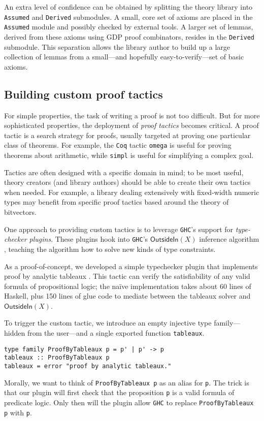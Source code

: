 \documentclass[format=sigplan, review=false, screen=true]{acmart}
\begin{document}
An extra level of confidence can be obtained by splitting the theory library
into \texttt{Assumed} and \texttt{Derived} submodules. A small, core set of
axioms are placed in the \texttt{Assumed} module and possibly checked by
external tools. A larger set of lemmas, derived from these axioms using GDP
proof combinators, resides in the \texttt{Derived} submodule. This separation
allows the library author to build up a large collection of lemmas from a
small---and hopefully easy-to-verify---set of basic axioms.

\subsection{Building custom proof tactics}\label{tactics}

For simple properties, the task of writing a proof is not too difficult. But for
more sophisticated properties, the deployment of \emph{proof tactics} becomes
critical. A proof tactic is a search strategy for proofs, usually targeted at
proving one particular class of theorems. For example, the \texttt{Coq} tactic
\texttt{omega} is useful for proving theorems about arithmetic, while
\texttt{simpl} is useful for simplifying a complex goal.

Tactics are often designed with a specific domain in mind; to be most useful,
theory creators (and library authors) should be able to create their own tactics
when needed. For example, a library dealing extensively with fixed-width numeric types
may benefit from specific proof tactics based around the theory of bitvectors.

One approach to providing custom tactics is to leverage \texttt{GHC}'s support for
\emph{type-checker plugins}. These plugins hook into \texttt{GHC}'s $\textsf{OutsideIn}(X)$
inference algorithm \cite{vytiniotis2011outsidein}, teaching the algorithm how to solve
new kinds of type constraints.

As a proof-of-concept, we developed a simple typechecker plugin that implements
proof by analytic tableaux \cite{smullyan1995first}. This tactic can verify the satisfiability of any
valid formula of propositional logic; the na\"ive implementation takes about
60 lines of Haskell, plus 150 lines of glue code to mediate between
the tableaux solver and $\textsf{OutsideIn}(X)$.

To trigger the custom tactic, we introduce an empty injective type family---hidden
from the user---and a single exported function \texttt{tableaux}.
\begin{verbatim}
type family ProofByTableaux p = p' | p' -> p
tableaux :: ProofByTableaux p
tableaux = error "proof by analytic tableaux."
\end{verbatim}
Morally, we want to think of \texttt{ProofByTableaux p} as an alias for \texttt{p}.
The trick is that our plugin will first check that the proposition \texttt{p} is
a valid formula of predicate logic. Only then will the plugin allow \texttt{GHC}
to replace \texttt{ProofByTableaux p} with \texttt{p}.
\end{document}
